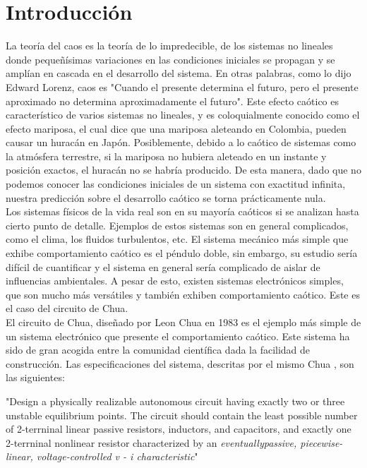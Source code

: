 \documentclass[%
 reprint,
 amsmath,amssymb,
 aps,
]{revtex4-1}
\begin{document}
\section{\label{sec:level1}Introducci\'on}
La teoría del caos es la teoría de lo impredecible, de los sistemas no lineales donde pequeñísimas variaciones en las condiciones iniciales se propagan y se amplían en cascada en el desarrollo del sistema. En otras palabras, como lo dijo Edward Lorenz, caos es "Cuando el presente determina el futuro, pero el presente aproximado no determina aproximadamente el futuro". Este efecto caótico es característico de varios sistemas no lineales, y es coloquialmente conocido como el efecto mariposa, el cual dice que una mariposa aleteando en Colombia, pueden causar un huracán en Japón. Posiblemente, debido a lo caótico de sistemas como la atmósfera terrestre, si la mariposa no hubiera aleteado en un instante y posición exactos, el huracán no se habría producido. De esta manera, dado que no podemos conocer las condiciones iniciales de un sistema con exactitud infinita, nuestra predicción sobre el desarrollo caótico se torna prácticamente nula.\\

Los sistemas físicos de la vida real son en su mayoría caóticos si se analizan hasta cierto punto de detalle. Ejemplos de estos sistemas son en general complicados, como el clima, los fluidos turbulentos, etc. El sistema mecánico más simple que exhibe comportamiento caótico es el péndulo doble, sin embargo, su estudio sería difícil de cuantificar y el sistema en general sería complicado de aislar de influencias ambientales. A pesar de esto, existen sistemas electrónicos simples, que son mucho más versátiles y también exhiben comportamiento caótico. Este es el caso del circuito de Chua.\\

El circuito de Chua, diseñado por Leon Chua en 1983 es el ejemplo más simple de un sistema electrónico que presente el comportamiento caótico. Este sistema ha sido de gran acogida entre la comunidad científica dada la facilidad de construcción. Las especificaciones del sistema, descritas por el mismo Chua \cite{chua}, son las siguientes: \\

\begin{addmargin}[3em]{2em}
"Design a physically realizable autonomous circuit having exactly two or three unstable equilibrium points. The circuit should contain the least possible number of 2-terrninal linear passive resistors, inductors, and capacitors, and exactly one 2-terrninal nonlinear resistor characterized by an \textit{eventuallypassive, piecewise-linear, voltage-controlled v - i characteristic}" \\
\end{addmargin}
\end{document}
